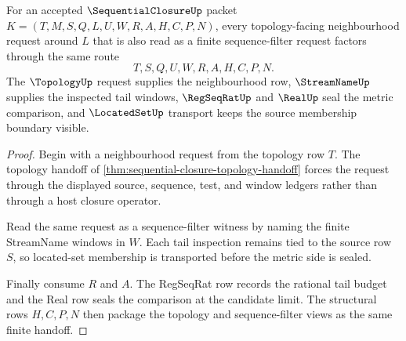 \begin{theorem}
\label{thm:sequentialclosure-topology-sequence-filter-handoff}
For an accepted $\SequentialClosureUp$ packet $K=(T,M,S,Q,L,U,W,R,A,H,C,P,N)$, every topology-facing neighbourhood request around $L$ that is also read as a finite sequence-filter request factors through the same route
$$
T,S,Q,U,W,R,A,H,C,P,N.
$$
The $\TopologyUp$ request supplies the neighbourhood row, $\StreamNameUp$ supplies the inspected tail windows, $\RegSeqRatUp$ and $\RealUp$ seal the metric comparison, and $\LocatedSetUp$ transport keeps the source membership boundary visible.
\end{theorem}
\begin{proof}
Begin with a neighbourhood request from the topology row $T$. The topology handoff of \autoref{thm:sequential-closure-topology-handoff} forces the request through the displayed source, sequence, test, and window ledgers rather than through a host closure operator.

Read the same request as a sequence-filter witness by naming the finite StreamName windows in $W$. Each tail inspection remains tied to the source row $S$, so located-set membership is transported before the metric side is sealed.

Finally consume $R$ and $A$. The RegSeqRat row records the rational tail budget and the Real row seals the comparison at the candidate limit. The structural rows $H,C,P,N$ then package the topology and sequence-filter views as the same finite handoff.
\end{proof}

